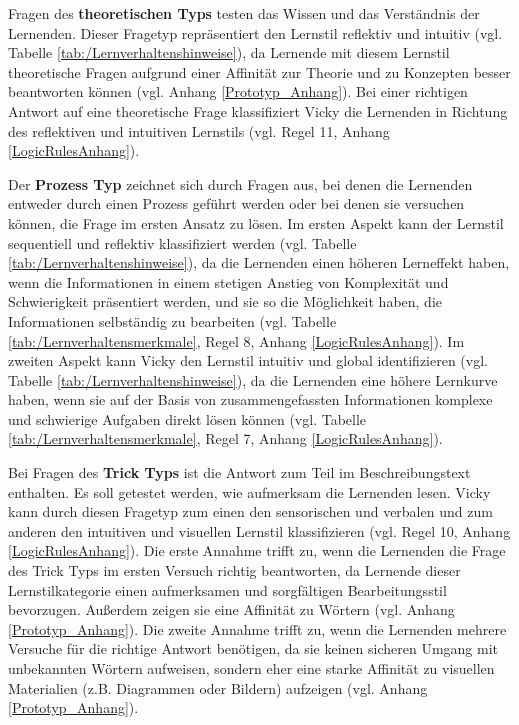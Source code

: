 Fragen des \textbf{theoretischen Typs} testen das Wissen und das Verständnis der Lernenden. \parencite[74]{Latham.2011} Dieser Fragetyp repräsentiert den 
Lernstil reflektiv und intuitiv (vgl. Tabelle \ref{tab:/Lernverhaltenshinweise}), da Lernende mit diesem Lernstil theoretische Fragen aufgrund einer Affinität zur
Theorie und zu Konzepten besser beantworten können (vgl. Anhang \ref{Prototyp_Anhang}). 
Bei einer richtigen Antwort auf eine theoretische Frage klassifiziert Vicky
die Lernenden in Richtung des reflektiven und intuitiven Lernstils (vgl. Regel 11, Anhang \ref{LogicRulesAnhang}).

Der \textbf{Prozess Typ} zeichnet sich durch Fragen aus, bei denen die Lernenden entweder durch einen Prozess geführt werden oder bei denen sie versuchen können, die Frage im ersten Ansatz zu lösen. \parencite[74]{Latham.2011}
Im ersten Aspekt kann der Lernstil sequentiell und reflektiv klassifiziert werden (vgl. Tabelle \ref{tab:/Lernverhaltenshinweise}), da die Lernenden einen höheren Lerneffekt haben, wenn die Informationen 
in einem stetigen Anstieg von Komplexität und Schwierigkeit präsentiert werden, und sie so die Möglichkeit haben, die Informationen selbständig zu bearbeiten (vgl. Tabelle \ref{tab:/Lernverhaltensmerkmale}, Regel 8, Anhang \ref{LogicRulesAnhang}).
Im zweiten Aspekt kann Vicky den Lernstil intuitiv und global identifizieren (vgl. Tabelle \ref{tab:/Lernverhaltenshinweise}), da die 
Lernenden eine höhere Lernkurve haben, wenn sie auf der Basis von
zusammengefassten Informationen komplexe und schwierige Aufgaben direkt lösen können (vgl. Tabelle \ref{tab:/Lernverhaltensmerkmale}, Regel 7, Anhang \ref{LogicRulesAnhang}).

Bei Fragen des \textbf{Trick Typs} ist die Antwort zum Teil im Beschreibungstext enthalten.
Es soll getestet werden, wie aufmerksam die Lernenden lesen. \parencite[74]{Latham.2011}
Vicky kann durch diesen Fragetyp zum einen den sensorischen und verbalen und zum anderen 
den intuitiven und visuellen Lernstil klassifizieren (vgl. Regel 10, Anhang \ref{LogicRulesAnhang}).
Die erste Annahme trifft zu, wenn die Lernenden die Frage des Trick Typs im ersten Versuch richtig beantworten, 
da Lernende dieser Lernstilkategorie einen aufmerksamen und sorgfältigen Bearbeitungsstil bevorzugen. Außerdem
zeigen sie eine Affinität zu Wörtern (vgl. Anhang \ref{Prototyp_Anhang}).
Die zweite Annahme trifft zu, wenn die Lernenden mehrere Versuche für die richtige Antwort benötigen, 
da sie keinen sicheren Umgang mit unbekannten Wörtern aufweisen, sondern eher eine starke Affinität zu visuellen Materialien (z.B. Diagrammen oder Bildern) aufzeigen (vgl. Anhang \ref{Prototyp_Anhang}).

